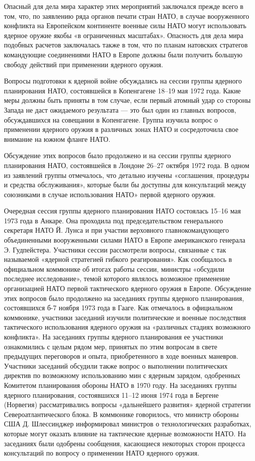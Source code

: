 \documentclass[12pt, a4paper, openany]{book}
\begin{document}
	Опасный для дела мира характер этих мероприятий заключался прежде всего в том, что, по заявлению ряда органов печати стран НАТО, в случае вооруженного конфликта на Европейском континенте военные силы НАТО могут использовать ядерное оружие якобы «в ограниченных масштабах». Опасность для дела мира подобных расчетов заключалась также в том, что по планам натовских стратегов командующие соединениями НАТО в Европе должны были получить большую свободу действий при применении ядерного оружия.
	
Вопросы подготовки к ядерной войне обсуждались на сессии группы ядерного планирования НАТО, состоявшейся в Копенгагене 18–19 мая 1972 года. Какие меры должны быть приняты в том случае, если первый атомный удар со стороны Запада не даст ожидаемого результата — это был один из главных вопросов, обсуждавшихся на совещании в Копенгагене. Группа изучила вопрос о применении ядерного оружия в различных зонах НАТО и сосредоточила свое внимание на южном фланге НАТО.
	
Обсуждение этих вопросов было продолжено и на сессии группы ядерного планирования НАТО, состоявшейся в Лондоне 26–27 октября 1972 года. В одном из заявлений группы отмечалось, что детально изучены «соглашения, процедуры и средства обслуживания», которые были бы доступны для консультаций между союзниками в случае использования НАТО» первой ядерного оружия.
	
	Очередная сессия группы ядерного планирования НАТО состоялась 15–16 мая 1973 года в Анкаре. Она проходила под председательством генерального секретаря НАТО Й. Лунса и при участии верховного главнокомандующего объединенными вооруженными силами НАТО в Европе американского генерала Э. Гудпейстера. Участники сессии рассмотрели вопросы, связанные с так называемой «ядерной стратегией гибкого реагирования». Как сообщалось в официальном коммюнике об итогах работы сессии, министры «обсудили последнее исследование», темой которого являлось возможное применение организацией НАТО первой тактического ядерного оружия в Европе. Обсуждение этих вопросов было продолжено на заседаниях группы ядерного планирования, состоявшихся б-7 ноября 1973 года в Гааге. Как отмечалось в официальном коммюнике, участники заседаний изучили политические и военные последствия тактического использования ядерного оружия на «различных стадиях возможного конфликта». На заседаниях группы ядерного планирования ее участники ознакомились с целым рядом мер, принятых по этим вопросам в свете предыдущих переговоров и опыта, приобретенного в ходе военных маневров. Участники заседаний обсудили также вопрос о выполнении политических директив по возможному использованию мин с ядерным зарядом, одобренных Комитетом планирования обороны НАТО в 1970 году. На заседаниях группы ядерного планирования, состоявшихся 11–12 июня 1974 года в Бергене (Норвегия) рассматривались вопросы «дальнейшего развития» ядерной стратегии Североатлантического блока. В коммюнике говорилось, что министр обороны США Д. Шлессинджер информировал министров о технологических разработках, которые могут оказать влияние на тактические ядерные возможности НАТО. На заседаниях были одобрены сообщения, касающиеся некоторых сторон процесса консультаций по вопросу о применении НАТО ядерного оружия.
	
\end{document}
